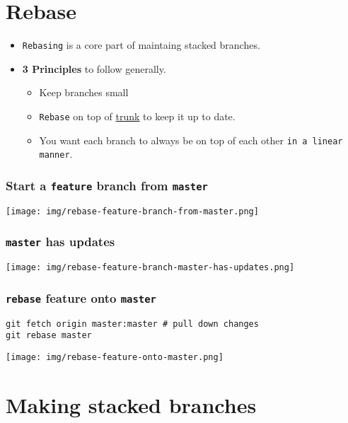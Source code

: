 \documentclass[11pt]{article}
\begin{document}
\section{Rebase}
\label{sec:org7b5fd74}
\begin{itemize}
\item \texttt{Rebasing} is a core part of maintaing stacked branches.
\item \textbf{3 Principles} to follow generally.
\begin{itemize}
\item Keep branches small
\item \texttt{Rebase} on top of \uline{trunk} to keep it up to date.
\item You want each branch to always be on top of each other \texttt{in a linear manner}.
\end{itemize}
\end{itemize}
\subsubsection{Start a \texttt{feature} branch from \texttt{master}}
\label{sec:org4422e5a}
\begin{center}
\texttt{[image: img/rebase-feature-branch-from-master.png]}
\label{org801a71e}
\end{center}
\subsubsection{\texttt{master} has updates}
\label{sec:org04c3cdc}
\begin{center}
\texttt{[image: img/rebase-feature-branch-master-has-updates.png]}
\label{org03a6a70}
\end{center}
\subsubsection{\texttt{rebase} feature onto \texttt{master}}
\label{sec:orgd0bf04c}
\begin{verbatim}
git fetch origin master:master # pull down changes
git rebase master
\end{verbatim}

\begin{center}
\texttt{[image: img/rebase-feature-onto-master.png]}
\label{org7d48271}
\end{center}
\section{Making stacked branches}
\label{sec:org2f57e96}
\end{document}
